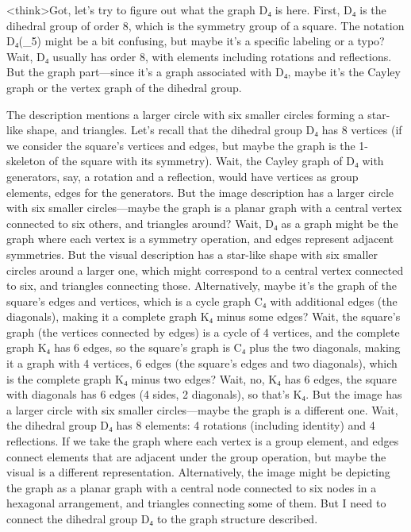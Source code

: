<think>Got, let's try to figure out what the graph D₄ is here. First, D₄ is the dihedral group of order 8, which is the symmetry group of a square. The notation D₄(_5) might be a bit confusing, but maybe it's a specific labeling or a typo? Wait, D₄ usually has order 8, with elements including rotations and reflections. But the graph part—since it's a graph associated with D₄, maybe it's the Cayley graph or the vertex graph of the dihedral group. 

The description mentions a larger circle with six smaller circles forming a star-like shape, and triangles. Let's recall that the dihedral group D₄ has 8 vertices (if we consider the square's vertices and edges, but maybe the graph is the 1-skeleton of the square with its symmetry). Wait, the Cayley graph of D₄ with generators, say, a rotation and a reflection, would have vertices as group elements, edges for the generators. But the image description has a larger circle with six smaller circles—maybe the graph is a planar graph with a central vertex connected to six others, and triangles around? Wait, D₄ as a graph might be the graph where each vertex is a symmetry operation, and edges represent adjacent symmetries. But the visual description has a star-like shape with six smaller circles around a larger one, which might correspond to a central vertex connected to six, and triangles connecting those. Alternatively, maybe it's the graph of the square's edges and vertices, which is a cycle graph C₄ with additional edges (the diagonals), making it a complete graph K₄ minus some edges? Wait, the square's graph (the vertices connected by edges) is a cycle of 4 vertices, and the complete graph K₄ has 6 edges, so the square's graph is C₄ plus the two diagonals, making it a graph with 4 vertices, 6 edges (the square's edges and two diagonals), which is the complete graph K₄ minus two edges? Wait, no, K₄ has 6 edges, the square with diagonals has 6 edges (4 sides, 2 diagonals), so that's K₄. But the image has a larger circle with six smaller circles—maybe the graph is a different one. Wait, the dihedral group D₄ has 8 elements: 4 rotations (including identity) and 4 reflections. If we take the graph where each vertex is a group element, and edges connect elements that are adjacent under the group operation, but maybe the visual is a different representation. Alternatively, the image might be depicting the graph as a planar graph with a central node connected to six nodes in a hexagonal arrangement, and triangles connecting some of them. But I need to connect the dihedral group D₄ to the graph structure described. 

